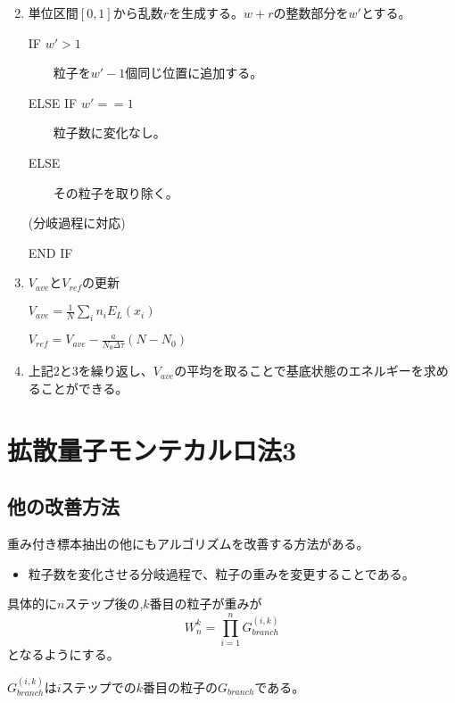 \documentclass[dvipdfmx]{beamer}
\begin{document}
    \begin{frame}
        \begin{enumerate}
            \setcounter{enumi}{1}

            \item 単位区間$[0,1]$から乱数$r$を生成する。$w+r$の整数部分を$w'$とする。

            IF $w' > 1$

            ~~~~粒子を$w'-1$個同じ位置に追加する。

            ELSE IF $w' == 1$

            ~~~~粒子数に変化なし。

            ELSE

            ~~~~その粒子を取り除く。

            (分岐過程に対応)

            END IF

            \item $V_{ave}$と$V_{ref}$の更新

            $V_{ave} = \frac{1}{N}\sum_{i} n_i E_L(x_i)$

            $V_{ref} = V_{ave} - \frac{a}{N_0\Delta\tau}(N-N_0)$

            \item 上記$2$と$3$を繰り返し、$V_{ave}$の平均を取ることで基底状態のエネルギーを求めることができる。
        \end{enumerate}
    \end{frame}

    \section{拡散量子モンテカルロ法3}

    \subsection{他の改善方法}
    \begin{frame}
      重み付き標本抽出の他にもアルゴリズムを改善する方法がある。

      \begin{itemize}
        \item 粒子数を変化させる分岐過程で、粒子の重みを変更することである。
      \end{itemize}
      具体的に$n$ステップ後の,$k$番目の粒子が重みが
      \begin{equation}
        W_n^k = \prod_{i = 1}^n G_{branch}^{(i,k)}
      \end{equation}
      となるようにする。

      $G_{branch}^{(i,k)}$は$i$ステップでの$k$番目の粒子の$G_{branch}$である。

    \end{frame}
\end{document}
